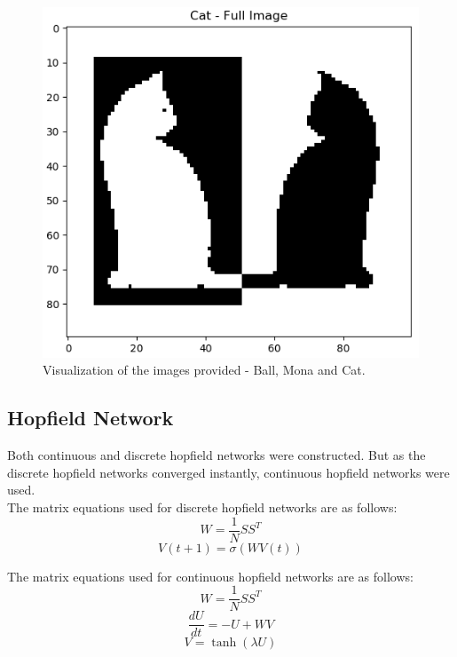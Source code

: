 \documentclass[12pt,a4paper]{article}
\newcommand{\noi}{\noindent}
\begin{document}
\begin{figure}[H]
\includegraphics[scale=0.3]{images/cat.png}
\caption{Visualization of the images provided - Ball, Mona and Cat.}
\end{figure}

\subsection{Hopfield Network}
Both continuous and discrete hopfield networks were constructed. But as the discrete hopfield networks converged instantly, continuous hopfield networks were used.\\

\noi
The matrix equations used for discrete hopfield networks are as follows:
\begin{equation}
W = \frac{1}{N}SS^T
\end{equation}
\begin{equation}
V(t+1) = \sigma(WV(t))
\end{equation}

\noi
The matrix equations used for continuous hopfield networks are as follows:
\begin{equation}
W = \frac{1}{N}SS^T
\end{equation}
\begin{equation}
\frac{dU}{dt} = -U + WV
\end{equation}
\begin{equation}
V = \tanh(\lambda U)
\end{equation}
\end{document}
